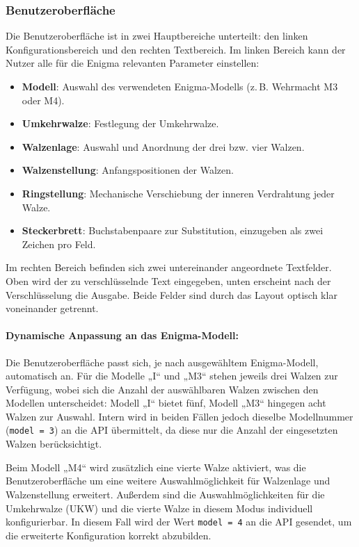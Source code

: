 \documentclass[12pt, ngerman, a4paper, numbers=noenddot]{article}
\begin{document}
\subsubsection{Benutzeroberfläche}

Die Benutzeroberfläche ist in zwei Hauptbereiche unterteilt: den linken Konfigurationsbereich und den rechten Textbereich. Im linken Bereich kann der Nutzer alle für die Enigma relevanten Parameter einstellen:

\begin{itemize}
	\item \textbf{Modell}: Auswahl des verwendeten Enigma-Modells (z.\,B. Wehrmacht M3 oder M4).
	\item \textbf{Umkehrwalze}: Festlegung der Umkehrwalze.
	\item \textbf{Walzenlage}: Auswahl und Anordnung der drei bzw. vier Walzen.
	\item \textbf{Walzenstellung}: Anfangspositionen der Walzen.
	\item \textbf{Ringstellung}: Mechanische Verschiebung der inneren Verdrahtung jeder Walze.
	\item \textbf{Steckerbrett}: Buchstabenpaare zur Substitution, einzugeben als zwei Zeichen pro Feld.
\end{itemize}

Im rechten Bereich befinden sich zwei untereinander angeordnete Textfelder. Oben wird der zu verschlüsselnde Text eingegeben, unten erscheint nach der Verschlüsselung die Ausgabe. Beide Felder sind durch das Layout optisch klar voneinander getrennt.

\paragraph{Dynamische Anpassung an das Enigma-Modell:}
Die Benutzeroberfläche passt sich, je nach ausgewähltem Enigma-Modell, automatisch an. Für die Modelle „I“ und „M3“ stehen jeweils drei Walzen zur Verfügung, wobei sich die Anzahl der auswählbaren Walzen zwischen den Modellen unterscheidet: Modell „I“ bietet fünf, Modell „M3“ hingegen acht Walzen zur Auswahl. Intern wird in beiden Fällen jedoch dieselbe Modellnummer (\lstinline|model = 3|) an die API übermittelt, da diese nur die Anzahl der eingesetzten Walzen berücksichtigt.

Beim Modell „M4“ wird zusätzlich eine vierte Walze aktiviert, was die Benutzeroberfläche um eine weitere Auswahlmöglichkeit für Walzenlage und Walzenstellung erweitert. Außerdem sind die Auswahlmöglichkeiten für die Umkehrwalze (UKW) und die vierte Walze in diesem Modus individuell konfigurierbar. In diesem Fall wird der Wert \lstinline|model = 4| an die API gesendet, um die erweiterte Konfiguration korrekt abzubilden.
\end{document}
